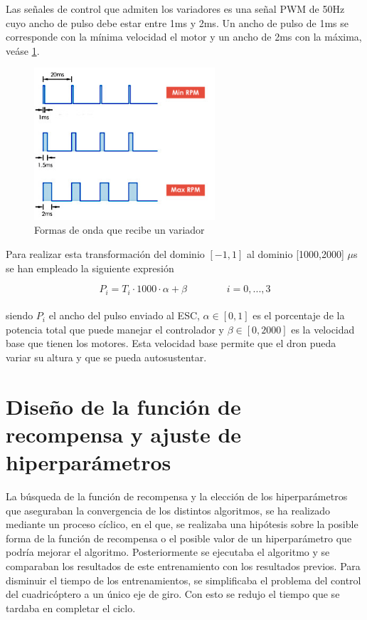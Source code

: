 Las señales de control que admiten los variadores es una señal PWM de 50Hz cuyo ancho de pulso debe estar entre 1ms y 2ms. Un ancho de pulso de 1ms se corresponde con la mínima velocidad el motor y un ancho de 2ms con la máxima, veáse \cref{hardware_ESCWAVE}.\newpage

\begin{figure}[htb!]
	\centering
	\includegraphics[width=0.6\textwidth]{hardware/ESCWaves}
	\caption{Formas de onda que recibe un variador}
	\label{hardware_ESCWAVE}	
\end{figure}

 Para realizar esta transformación del dominio $[-1,1]$ al dominio [1000,2000] $\mu$s se han empleado la siguiente expresión

\begin{equation}
	P_i= T_i \cdot 1000 \cdot \alpha + \beta \qquad \qquad i=0,...,3
\end{equation}\\
siendo $P_i$ el ancho del pulso enviado al ESC, $\alpha \in [0,1]$  es el porcentaje de la potencia total que puede manejar el controlador y $\beta \in [0,2000]$ es la velocidad base que tienen los motores. Esta velocidad base permite que el dron pueda variar su altura y que se pueda autosustentar. 

\section{Diseño de la función de recompensa y ajuste de hiperparámetros}

La búsqueda de la función de recompensa y la elección de los hiperparámetros que aseguraban la convergencia de los distintos algoritmos, se ha realizado mediante un proceso cíclico, en el que, se realizaba una hipótesis sobre la posible forma de la función de recompensa o el posible valor de un hiperparámetro que podría mejorar el algoritmo. Posteriormente se ejecutaba el algoritmo y se comparaban los resultados de este entrenamiento con los resultados previos. Para disminuir el tiempo de los entrenamientos, se simplificaba el problema del control del cuadricóptero a un único eje de giro. Con esto se redujo el tiempo que se tardaba en completar el ciclo.


